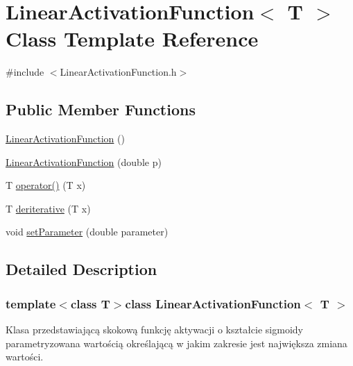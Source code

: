 \hypertarget{class_linear_activation_function}{\section{\-Linear\-Activation\-Function$<$ \-T $>$ \-Class \-Template \-Reference}
\label{class_linear_activation_function}
}


{\ttfamily \#include $<$\-Linear\-Activation\-Function.\-h$>$}

\subsection*{\-Public \-Member \-Functions}
\begin{DoxyCompactItemize}
\item 
\hyperlink{class_linear_activation_function_a0474630a90119eb50d775b3e9aa46b30}{\-Linear\-Activation\-Function} ()
\item 
\hyperlink{class_linear_activation_function_ada030e1ea55f5127fdd7455279177be1}{\-Linear\-Activation\-Function} (double p)
\item 
\-T \hyperlink{class_linear_activation_function_a97e4c739f6cfb4b8b639e5921f6d4733}{operator()} (\-T x)
\item 
\-T \hyperlink{class_linear_activation_function_aed111abd3fbc37e8a0faff788258a97d}{deriterative} (\-T x)
\item 
void \hyperlink{class_linear_activation_function_ad7a5e2511224ce15c616e1aac7f95706}{set\-Parameter} (double parameter)
\end{DoxyCompactItemize}


\subsection{\-Detailed \-Description}
\subsubsection*{template$<$class T$>$class Linear\-Activation\-Function$<$ T $>$}

\-Klasa przedstawiającą skokową funkcję aktywacji o kształcie sigmoidy parametryzowana wartością określającą w jakim zakresie jest największa zmiana wartości. 


